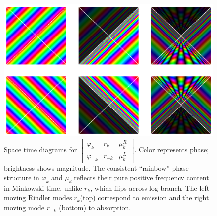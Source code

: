 \documentclass[12pt,a4paper]{article}
\begin{document}
\begin{figure}[h]
\centering
\includegraphics[scale=0.5]{unruh_mode_rainbow.png}
\captionsetup{width=0.7\textwidth}
\caption{Space time diagrams for $\left[\begin{array}{ccc} \varphi_k & r_k & \mu^R_k \\ \varphi_{-k} & r_{-k} & \mu^L_k \end{array} \right]$. Color represents phase; brightness shows magnitude. The consistent ``rainbow'' phase structure in $\varphi_k$ and $\mu_k$ reflects their pure positive frequency content in Minkowski time, unlike $r_k$, which flips across log branch. The left moving Rindler modes $r_k$(top) correspond to emission and the right moving mode $r_{-k}$ (bottom) to absorption.}
\label{unruh_rainbow}
\end{figure}
\end{document}
